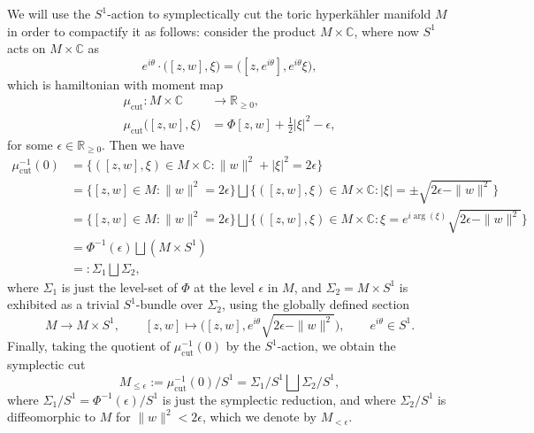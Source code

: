 \documentclass[11pt]{amsart}
\newcommand{\st}{\ensuremath{:}}%
\newcommand{\m}{\mu}
\newcommand{\e}{\epsilon}
\newcommand{\HK}{hyperk\"ahler }
\newcommand{\RR}{\mathbb{R}}
\newcommand{\CC}{\mathbb{C}}
\begin{document}
We will use the $S^{1}$-action to symplectically cut the toric \HK manifold $M$ in order to compactify it as follows: consider the product $M \times \CC$, where now $S^{1}$ acts on $M \times \CC$ as
$$
e^{i\theta} \cdot \big( [z,w], \xi   \big) = \big( [z,e^{i\theta}], e^{i\theta}\xi\big),
$$
which is hamiltonian with moment map
\begin{equation*}
	\begin{split}
		\mu_{\text{cut}}: M \times \CC &\longrightarrow \RR_{\geq 0}, \\
		\mu_{\text{cut}}\big( [z,w], \xi  \big) &= \Phi[z,w] + \tfrac{1}{2}|\xi|^{2} - \e,
	\end{split}
\end{equation*}
for some $\e \in \RR_{\geq 0}$. Then we have
\begin{equation*}
	\begin{split}
		\mu_{\text{cut}}^{-1}(0) &= \big\{ ([z,w],\xi) \in M \times \CC \st \|w\|^{2} + |\xi|^{2} = 2\e    \big\} \\
		&= \big\{ [z,w] \in M \st \|w\|^{2} = 2\e    \big\} \bigsqcup \big\{ ([z,w],\xi) \in M \times \CC \st |\xi| = \pm\sqrt{2\e - \|w\|^{2}} \big\} \\
		&= \big\{ [z,w] \in M \st \|w\|^{2} = 2\e    \big\} \bigsqcup \big\{ ([z,w],\xi) \in M \times \CC \st \xi = e^{i\arg(\xi)}\sqrt{2\e - \|w\|^{2}}    \big\} \\
		&= \Phi^{-1}(\e) \bigsqcup (M \times S^{1}) \\
		&=: \Sigma_{1} \bigsqcup \Sigma_{2},
	\end{split}
\end{equation*}
where $\Sigma_{1}$ is just the level-set of $\Phi$ at the level $\e$ in $M$, and $\Sigma_{2} = M \times S^{1}$ is exhibited as a trivial $S^{1}$-bundle over $\Sigma_{2}$, using the globally defined section
\begin{equation*}
	M \rightarrow M \times S^{1}, \qquad [z,w] \longmapsto \big( [z,w], e^{i\theta}\sqrt{2\e - \|w\|^{2}}\big), \qquad e^{i\theta} \in S^{1}.
\end{equation*}
Finally, taking the quotient of $\m_{\text{cut}}^{-1}(0)$ by the $S^{1}$-action, we obtain the symplectic cut
\begin{equation*}
	M_{\leq \e} := \m_{\text{cut}}^{-1}(0)/S^{1} = \Sigma_{1}/S^{1} \bigsqcup \Sigma_{2}/S^{1},
\end{equation*}
where $\Sigma_{1}/S^{1} = \Phi^{-1}(\e)/S^{1}$ is just the symplectic reduction, and where $\Sigma_{2}/S^{1}$ is diffeomorphic to $M$ for $\|w\|^{2} < 2\e$, which we denote by $M_{<\epsilon}$.
\end{document}
